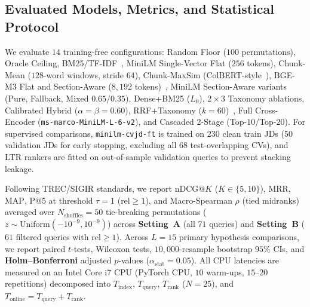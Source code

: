 \subsection{Evaluated Models, Metrics, and Statistical Protocol}
We evaluate $14$ training-free configurations: Random Floor ($100$ permutations), Oracle Ceiling, BM25/TF-IDF~\cite{robertson2009probabilistic}, MiniLM Single-Vector Flat ($256$ tokens), Chunk-Mean ($128$-word windows, stride $64$), Chunk-MaxSim (ColBERT-style~\cite{khattab2020colbert}), BGE-M3 Flat and Section-Aware ($8{,}192$ tokens)~\cite{chen2024bge}, MiniLM Section-Aware variants (Pure, Fallback, Mixed $0.65/0.35$), Dense+BM25 ($L_0$), $2\times 3$ Taxonomy ablations, Calibrated Hybrid ($\alpha=\beta=0.60$), RRF+Taxonomy ($k=60$)~\cite{cormack2009reciprocal}, Full Cross-Encoder (\texttt{ms-marco-MiniLM-L-6-v2}), and Cascaded 2-Stage (Top-$10$/Top-$20$). For supervised comparisons, \texttt{minilm-cvjd-ft} is trained on $230$ clean train JDs ($50$ validation JDs for early stopping, excluding all $68$ test-overlapping CVs), and LTR rankers are fitted on out-of-sample validation queries to prevent stacking leakage.

Following TREC/SIGIR standards, we report $\text{nDCG}@K$ ($K\in\{5,10\}$), $\text{MRR}$, $\text{MAP}$, $\text{P}@5$ at threshold $\tau=1$ ($\text{rel}\ge 1$), and Macro-Spearman $\rho$ (tied midranks) averaged over $N_{\text{shuffles}}=50$ tie-breaking permutations ($z\sim\text{Uniform}(-10^{-9},10^{-9})$) across \textbf{Setting~A} (all $71$ queries) and \textbf{Setting~B} ($61$ filtered queries with $\text{rel}\ge 1$). Across $L=15$ primary hypothesis comparisons, we report paired $t$-tests, Wilcoxon tests, $10{,}000$-resample bootstrap $95\%$ CIs, and \textbf{Holm--Bonferroni} adjusted $p$-values ($\alpha_{\text{stat}}=0.05$). All CPU latencies are measured on an Intel Core i7 CPU (PyTorch CPU, $10$ warm-ups, $15$--$20$ repetitions) decomposed into $T_{\text{index}}$, $T_{\text{query}}$, $T_{\text{rank}}$ ($N=25$), and $T_{\text{online}} = T_{\text{query}} + T_{\text{rank}}$.
